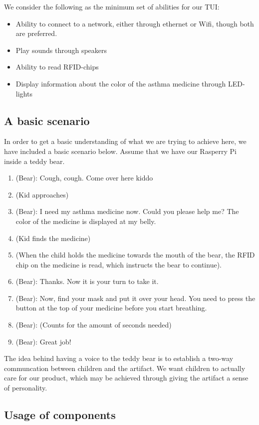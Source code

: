 We consider the following as the minimum set of abilities for our TUI:

\begin{itemize}
  \item Ability to connect to a network, either through ethernet or Wifi, though both are preferred. 
  \item Play sounds through speakers
  \item Ability to read RFID-chips
  \item Display information about the color of the asthma medicine through LED-lights
\end{itemize} 

\subsection{A basic scenario}
In order to get a basic understanding of what we are trying to achieve here, we have included a basic scenario below. Assume that we have our Rasperry Pi inside a teddy bear.  

\begin{enumerate}
  \item (Bear): Cough, cough. Come over here kiddo 
  \item (Kid approaches)
  \item (Bear): I need my asthma medicine now. Could you please help me? The color of the medicine is displayed at my belly.
  \item (Kid finds the medicine)
  \item (When the child holds the medicine towards the mouth of the bear, the RFID chip on the medicine is read, which instructs the bear to continue). 
  \item (Bear): Thanks. Now it is your turn to take it. 
  \item (Bear): Now, find your mask and put it over your head. You need to press the button at the top of your medicine before you start breathing. 
  \item (Bear): (Counts for the amount of seconds needed)
  \item (Bear): Great job!
\end{enumerate}

The idea behind having a voice to the teddy bear is to establish a two-way communcation between children and the artifact. We want children to actually care for our product, which may be achieved through giving the artifact a sense of personality. 


\subsection{Usage of components}

